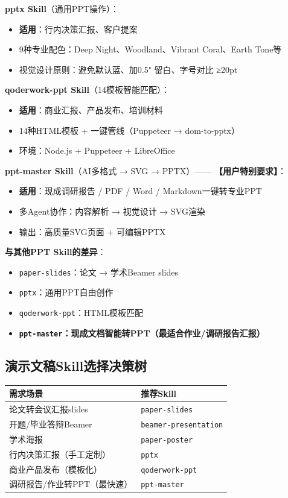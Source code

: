 \textbf{pptx Skill}（通用PPT操作）：
\begin{itemize}[leftmargin=1em]
  \item \textbf{适用}：行内决策汇报、客户提案
  \item 9种专业配色：Deep Night、Woodland、Vibrant Coral、Earth Tone等
  \item 视觉设计原则：避免默认蓝、加0.5" 留白、字号对比 ≥20pt
\end{itemize}

\textbf{qoderwork-ppt Skill}（14模板智能匹配）：
\begin{itemize}[leftmargin=1em]
  \item \textbf{适用}：商业汇报、产品发布、培训材料
  \item 14种HTML模板 + 一键管线（Puppeteer → dom-to-pptx）
  \item 环境：Node.js + Puppeteer + LibreOffice
\end{itemize}

\textbf{ppt-master Skill}（AI多格式 → SVG → PPTX）—— \textbf{【用户特别要求】}：
\begin{itemize}[leftmargin=1em]
  \item \textbf{适用}：现成调研报告 / PDF / Word / Markdown一键转专业PPT
  \item 多Agent协作：内容解析 → 视觉设计 → SVG渲染
  \item 输出：高质量SVG页面 + 可编辑PPTX
\end{itemize}

\textbf{与其他PPT Skill的差异}：
\begin{itemize}[leftmargin=1em]
  \item \texttt{paper-slides}：论文 → 学术Beamer slides
  \item \texttt{pptx}：通用PPT自由创作
  \item \texttt{qoderwork-ppt}：HTML模板匹配
  \item \textbf{\texttt{ppt-master}：现成文档智能转PPT（最适合作业/调研报告汇报）}
\end{itemize}

\subsection{演示文稿Skill选择决策树}

\begin{table}[H]
\centering
\begin{tabular}{|l|l|}
\hline
\textbf{需求场景} & \textbf{推荐Skill} \\
\hline
论文转会议汇报slides & \texttt{paper-slides} \\
开题/毕业答辩Beamer & \texttt{beamer-presentation} \\
学术海报 & \texttt{paper-poster} \\
行内决策汇报（手工定制） & \texttt{pptx} \\
商业产品发布（模板化） & \texttt{qoderwork-ppt} \\
调研报告/作业转PPT（最快速） & \texttt{ppt-master} \\
\hline
\end{tabular}
\end{table}

